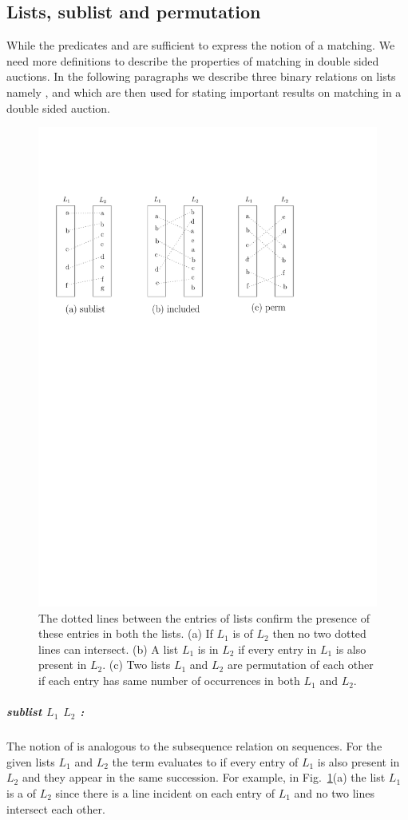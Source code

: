 \documentclass[a4paper,UKenglish,cleveref, autoref]{lipics-v2019}
\begin{document}
\subsection{Lists, sublist and permutation}
While the predicates  and    are sufficient to express the notion of a matching. We need more definitions to describe the properties of matching in double sided auctions.  In the following paragraphs we describe three binary relations on lists namely ,  and  which are then used for stating  important results on matching in a double sided auction. 

\begin{figure}[h!]
\centering
\includegraphics[width=.6\textwidth]{sub_inclu_perm.pdf}
\caption{The dotted lines between the entries of lists confirm the presence of these entries in both the lists. (a) If $L_1$ is  of $L_2$ then no two dotted lines can intersect. (b) A list $L_1$ is  in $L_2$ if every entry in $L_1$ is also present in $L_2$. (c) Two lists $L_1$ and $L_2$ are permutation of each other if each entry has same number of occurrences in both  $L_1$ and $L_2$. }
\label{fig:list}
\end{figure}

\subparagraph*{sublist $L_1$ $L_2$ :} The notion of   is analogous to the subsequence relation on sequences. For the given lists $L_1$ and $L_2$ the term   evaluates to   if every entry of $L_1$ is also present in $L_2$ and they appear in the same succession.  For example, in Fig.~\ref{fig:list}(a) the list $L_1$ is a  of $L_2$ since there is a line incident on each entry of $L_1$ and no two lines intersect each other. 
\end{document}
